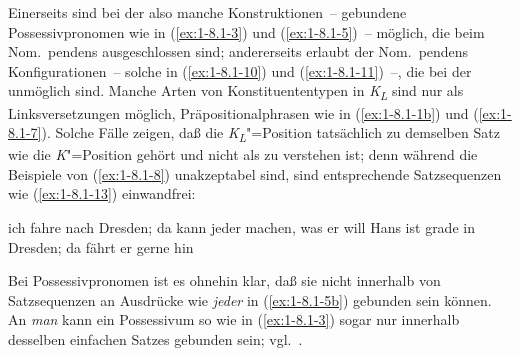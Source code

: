 \documentclass[output=paper]{langsci/langscibook}
\begin{document}
\addlines[-1]%
Einerseits sind bei der  also manche Konstruktionen~-- \zb gebundene Possessivpronomen wie in (\ref{ex:1-8.1-3}) und (\ref{ex:1-8.1-5})~-- möglich, die beim Nom.\ pendens ausgeschlossen sind; andererseits erlaubt der Nom.\ pendens Konfigurationen~-- \zb solche in (\ref{ex:1-8.1-10}) und (\ref{ex:1-8.1-11})~–, die bei der  unmöglich sind. Manche Arten von Konstituententypen in \textit{K\textsubscript{L}} sind nur als Linksversetzungen möglich, \zb Präpositionalphrasen wie in (\ref{ex:1-8.1-1b}) und (\ref{ex:1-8.1-7}). Solche Fälle zeigen, daß die \textit{K\textsubscript{L}}"=Position tatsächlich
zu demselben Satz wie die \textit{K}"=Position gehört und nicht als 
zu verstehen ist; denn während die Beispiele von (\ref{ex:1-8.1-8}) unakzeptabel sind, sind entsprechende Satzsequenzen wie (\ref{ex:1-8.1-13}) einwandfrei:
\begin{exe}
\ex\label{ex:1-8.1-13}
\begin{xlist}
\ex\label{ex:1-8.1-13a}  ich fahre nach Dresden; da kann jeder machen, was er will
\ex\label{ex:1-8.1-13b} Hans ist grade in Dresden; da fährt er gerne hin
\end{xlist}
\end{exe}
Bei Possessivpronomen ist es ohnehin klar, daß sie nicht innerhalb von Satzsequenzen an Ausdrücke wie \textit{jeder} in (\ref{ex:1-8.1-5b}) gebunden sein können. An \textit{man} kann ein Possessivum so wie in (\ref{ex:1-8.1-3}) sogar nur innerhalb desselben einfachen Satzes gebunden sein; vgl.\ \citet[§5.2]{Hoehle78a}.
\end{document}
